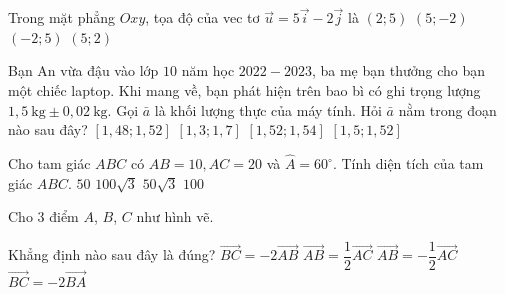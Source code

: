 \begin{ex}%
	Trong mặt phẳng $O x y$, tọa độ của vec tơ $\vec{u}=5 \vec{i}-2 \vec{j}$ là 
	\choice
	{$(2 ; 5)$}
	{\True $(5 ;-2)$}
	{$(-2 ; 5)$}
	{$(5 ; 2)$}
\end{ex}

\begin{ex}%
	Bạn An vừa đậu vào lớp $ 10 $ năm học $ 2022 - 2023 $, ba mẹ bạn thưởng cho bạn một chiếc laptop. Khi mang về, bạn phát hiện trên bao bì có ghi trọng lượng $1,5 \mathrm{~kg}\pm 0,02 \mathrm{~kg}$. Gọi $\bar{a}$ là khối lượng thực của máy tính. Hỏi $\bar{a}$ nằm trong đoạn nào sau đây?
	\choice
	{\True $[1,48 ; 1,52]$}
	{$[1,3 ; 1,7]$}
	{$[1,52 ; 1,54]$}
	{$[1,5 ; 1,52]$}
\end{ex}

\begin{ex}%
	Cho tam giác $A B C$ có $A B=10, A C=20$ và $\widehat{A}=60^{\circ}$. Tính diện tích của tam giác $ ABC $.
	\choice
	{$ 50  $}
	{$100 \sqrt{3}$}
	{\True $50 \sqrt{3}$}
	{$ 100  $}
 
 
\end{ex}

\begin{ex}%
	Cho 3 điểm $A$, $B$, $C$ như hình vẽ. 
	\begin{center}
	\end{center}
\noindent Khẳng định nào sau đây là đúng?
	\choice
	{$\overrightarrow{B C}=-2 \overrightarrow{A B}$}
	{$\overrightarrow{A B}=\dfrac{1}{2}\overrightarrow{A C}$}
	{$\overrightarrow{A B}=-\dfrac{1}{2}\overrightarrow{A C}$}
	{\True $\overrightarrow{B C}=-2 \overrightarrow{B A}$ }
\end{ex}



